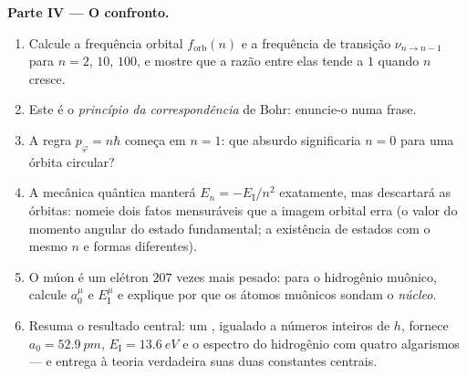 \begin{problem}
\medskip\noindent\textbf{Parte IV --- O confronto.}
\begin{enumerate}[resume]
  \item Calcule a frequência orbital $f_{\text{orb}}(n)$ e a
        frequência de transição $\nu_{n \to n-1}$ para $n = 2$, $10$,
        $100$, e mostre que a razão entre elas tende a $1$ quando $n$
        cresce.
  \item Este é o \emph{princípio da correspondência} de Bohr:
        enuncie-o numa frase.
  \item A regra $p_\varphi = n\hbar$ começa em $n = 1$: que absurdo
        significaria $n = 0$ para uma órbita circular?
  \item A mecânica quântica manterá $E_n = -E_{\text{I}}/n^2$
        exatamente, mas descartará as órbitas: nomeie dois fatos
        mensuráveis que a imagem orbital erra (o valor do momento
        angular do estado fundamental; a existência de estados com o
        mesmo $n$ e formas diferentes).
  \item O múon é um elétron $207$ vezes mais pesado: para o hidrogênio
        muônico, calcule $a_0^\mu$ e $E_{\text{I}}^\mu$ e explique por
        que os átomos muônicos sondam o \emph{núcleo}.
  \item Resuma o resultado central: um , igualado
        a números inteiros de $h$, fornece $a_0 = \qty{52.9}{pm}$,
        $E_{\text{I}} = \qty{13.6}{eV}$ e o espectro do hidrogênio com
        quatro algarismos --- e entrega à teoria verdadeira suas duas
        constantes centrais.
\end{enumerate}
\end{problem}
